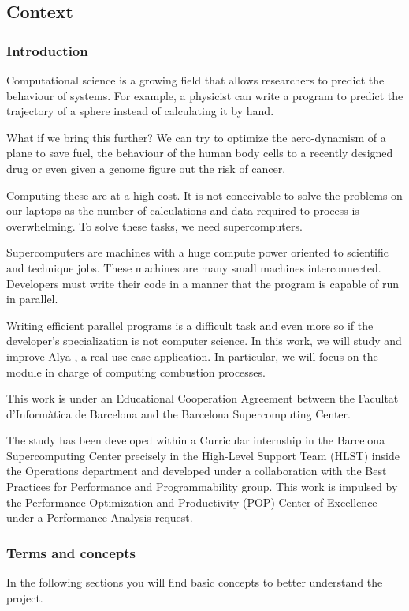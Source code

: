 \subsection{Context}

\subsubsection{Introduction}

Computational science is a growing field that allows researchers to predict the behaviour of systems. For example, a physicist can write a program to predict the trajectory of a sphere instead of calculating it by hand.

 What if we bring this further?  We can try to optimize the aero-dynamism of a plane to save fuel, the behaviour of the human body cells to a recently designed drug or even given a genome figure out the risk of cancer.

Computing these are at a high cost. It is not conceivable to solve the problems on our laptops as the number of calculations and data required to process is overwhelming. To solve these tasks, we need supercomputers.

Supercomputers are machines with a huge compute power oriented to scientific and technique jobs. These machines are many small machines interconnected. Developers must write their code in a manner that the program is capable of run in parallel. 

Writing efficient parallel programs is a difficult task and even more so if the developer's specialization is not computer science. In this work, we will study and improve Alya \cite{alya}, a real use case application. In particular, we will focus on the module in charge of computing combustion processes.


This work is under an Educational Cooperation Agreement between the Facultat d'Informàtica de Barcelona and the Barcelona Supercomputing Center.

The study has been developed within a Curricular internship in the Barcelona Supercomputing Center precisely in the High-Level Support Team (HLST) inside the Operations department and developed under a collaboration with the Best Practices for Performance and Programmability group. This work is impulsed by the Performance Optimization and Productivity \cite{popWeb} (POP) Center of Excellence under a  Performance Analysis request.

\subsubsection{Terms and concepts}
In the following sections you will find basic concepts to better understand the project.

